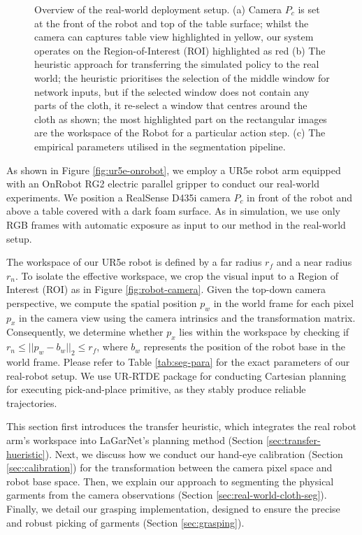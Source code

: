 \documentclass[journal]{IEEEtran}
\begin{document}
\begin{figure}[t!]
    \caption{Overview of the real-world deployment setup. (a) Camera $P_c$ is set at the front of the robot and top of the table surface; whilst the camera can captures table view highlighted in yellow, our system operates on the Region-of-Interest (ROI) highlighted as red (b) The heuristic approach for transferring the simulated policy to the real world; the heuristic prioritises the selection of the middle window for network inputs, but if the selected window does not contain any parts of the cloth, it re-select a window that centres around the cloth as shown; the most highlighted part on the rectangular images are the workspace of the  Robot for a particular action step. (c) The empirical parameters utilised in the segmentation pipeline.}
    \label{fig:real-world-overview}
\end{figure}
As shown in Figure \ref{fig:ur5e-onrobot}, we employ a UR5e robot arm equipped with an OnRobot RG2 electric parallel gripper to conduct our real-world experiments. We position a RealSense D435i camera $P_c$ in front of the robot and above a table covered with a dark foam surface. As in simulation, we use only RGB frames with automatic exposure as input to our method in the real-world setup.

The workspace of our UR5e robot is defined by a far radius $r_{f}$ and a near radius $r_{n}$. To isolate the effective workspace, we crop the visual input to a Region of Interest (ROI) as in Figure \ref{fig:robot-camera}. Given the top-down camera perspective, we compute the spatial position $p_w$ in the world frame for each pixel $p_x$ in the camera view using the camera intrinsics and the transformation matrix. Consequently, we determine whether $p_x$ lies within the workspace by checking if $r_n \leq ||p_w - b_w||_2 \leq r_f$, where $b_w$ represents the position of the robot base in the world frame. Please refer to Table \ref{tab:seg-para} for the exact parameters of our real-robot setup. We use UR-RTDE package \cite{urrtde2025} for conducting Cartesian planning for executing pick-and-place primitive, as they stably produce reliable trajectories.

This section first introduces the transfer heuristic, which integrates the real robot arm's workspace into LaGarNet's planning method (Section \ref{sec:transfer-hueristic}). Next, we discuss how we conduct our hand-eye calibration (Section \ref{sec:calibration}) for the transformation between the camera pixel space and robot base space. Then, we explain our approach to segmenting the physical garments from the camera observations (Section \ref{sec:real-world-cloth-seg}). Finally, we detail our grasping implementation, designed to ensure the precise and robust picking of garments (Section \ref{sec:grasping}).
\end{document}
